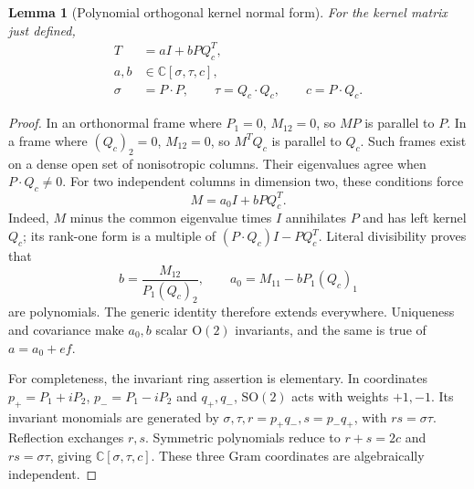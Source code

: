 \documentclass[11pt]{article}
\newtheorem{lemma}[theorem]{Lemma}
\numberwithin{equation}{section}
\begin{document}
\begin{lemma}[Polynomial orthogonal kernel normal form]\label{lem:matrix}
For the kernel matrix just defined,
\begin{equation}
 \begin{aligned}
 T&=aI+bPQ_c^T,\\
 a,b&\in\mathbb C[\sigma,\tau,c],\\
 \sigma&=P\cdot P,\qquad \tau=Q_c\cdot Q_c,\qquad c=P\cdot Q_c.
 \end{aligned}
 \tag{9}\label{eq:normalform}
\end{equation}
\end{lemma}

\begin{proof}
In an orthonormal frame where \(P_1=0\), \(M_{12}=0\), so \(MP\) is parallel
to \(P\). In a frame where \((Q_c)_2=0\), \(M_{12}=0\), so \(M^TQ_c\) is
parallel to \(Q_c\). Such frames exist on a dense open set of nonisotropic
columns. Their eigenvalues agree when \(P\cdot Q_c\ne0\). For two independent
columns in dimension two, these conditions force
\[
 M=a_0I+bPQ_c^T.
\]
Indeed, \(M\) minus the common eigenvalue times \(I\) annihilates \(P\) and
has left kernel \(Q_c\); its rank-one form is a multiple of
\((P\cdot Q_c)I-PQ_c^T\). Literal divisibility proves that
\[
 b=\frac{M_{12}}{P_1(Q_c)_2},\qquad a_0=M_{11}-bP_1(Q_c)_1
\]
are polynomials. The generic identity therefore extends everywhere.
Uniqueness and covariance make \(a_0,b\) scalar \(\mathrm O(2)\) invariants,
and the same is true of \(a=a_0+ef\).

For completeness, the invariant ring assertion is elementary. In coordinates
\(p_+=P_1+iP_2\), \(p_-=P_1-iP_2\) and \(q_+,q_-\),
\(\mathrm{SO}(2)\) acts with weights \(+1,-1\). Its invariant monomials
are generated by \(\sigma,\tau,r=p_+q_-,s=p_-q_+\), with
\(rs=\sigma\tau\). Reflection exchanges \(r,s\). Symmetric polynomials
reduce to \(r+s=2c\) and \(rs=\sigma\tau\), giving
\(\mathbb C[\sigma,\tau,c]\). These three Gram coordinates are algebraically
independent.
\end{proof}
\end{document}
